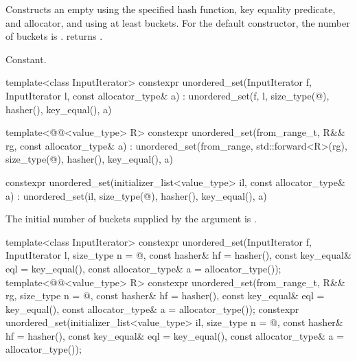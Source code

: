 \begin{itemdescr}
\pnum
\effects
Constructs an empty  using the
specified hash function, key equality predicate, and allocator, and
using at least  buckets.  For the default constructor,
the number of buckets is .
 returns .

\pnum
\complexity
Constant.
\end{itemdescr}

%
\begin{itemdecl}
template<class InputIterator>
  constexpr unordered_set(InputIterator f, InputIterator l, const allocator_type& a)
    : unordered_set(f, l,
                    size_type(@\seebelow@), hasher(), key_equal(), a) { }

template<@@<value_type> R>
  constexpr unordered_set(from_range_t, R&& rg, const allocator_type& a)
    : unordered_set(from_range, std::forward<R>(rg),
                    size_type(@\seebelow@), hasher(), key_equal(), a) { }

constexpr unordered_set(initializer_list<value_type> il, const allocator_type& a)
  : unordered_set(il, size_type(@\seebelow@), hasher(), key_equal(), a) { }
\end{itemdecl}

\begin{itemdescr}
\pnum
\remarks
The initial number of buckets supplied by the  argument is
.
\end{itemdescr}

%
\begin{itemdecl}
template<class InputIterator>
  constexpr unordered_set(InputIterator f, InputIterator l,
                          size_type n = @\seebelow@, const hasher& hf = hasher(),
                          const key_equal& eql = key_equal(),
                          const allocator_type& a = allocator_type());
template<@@<value_type> R>
  constexpr unordered_set(from_range_t, R&& rg,
                          size_type n = @\seebelow@, const hasher& hf = hasher(),
                          const key_equal& eql = key_equal(),
                          const allocator_type& a = allocator_type());
constexpr unordered_set(initializer_list<value_type> il,
                        size_type n = @\seebelow@, const hasher& hf = hasher(),
                        const key_equal& eql = key_equal(),
                        const allocator_type& a = allocator_type());
\end{itemdecl}

